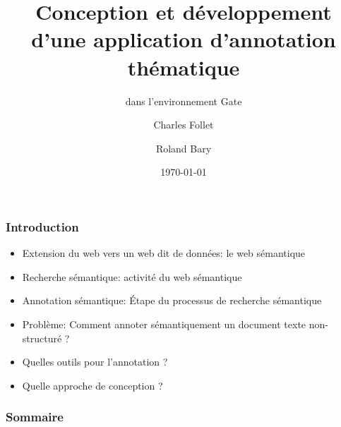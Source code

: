 \documentclass[10pt, compress]{beamer}
\title{Conception et développement d’une application d’annotation thématique}
\subtitle{dans l’environnement Gate}
\date{\today}
\author{Charles Follet \and Roland Bary}
\institute{Université de Pau et Pays de l'Adour}
\begin{document}
\maketitle
\begin{frame}[fragile]
	\frametitle{Introduction}
		\begin{itemize}[<+->]
  			[square]
  			\item{Extension du web vers un web dit de données: le web sémantique}
  			\item{Recherche sémantique: activité du web sémantique}
  			\item{Annotation sémantique: Étape du processus de recherche sémantique}
  			\item{Problème: Comment annoter sémantiquement un document texte non-structuré ?}
  			\item{Quelles outils pour l'annotation ?}
  			\item{Quelle approche de conception ?}
  		\end{itemize}
\end{frame}

\begin{frame}[fragile]
  \frametitle{Sommaire}
  \tableofcontents
\end{frame}
\end{document}
